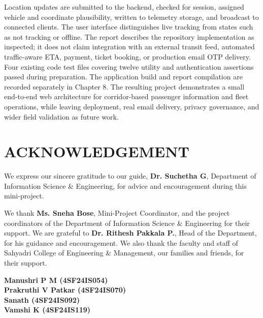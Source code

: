 \documentclass[12pt,a4paper]{report}
\begin{document}
Location updates are submitted to the backend, checked for session, assigned vehicle and coordinate plausibility, written to telemetry storage, and broadcast to connected clients. The user interface distinguishes live tracking from states such as not tracking or offline. The report describes the repository implementation as inspected; it does not claim integration with an external transit feed, automated traffic-aware ETA, payment, ticket booking, or production email OTP delivery. Four existing code test files covering twelve utility and authentication assertions passed during preparation. The application build and report compilation are recorded separately in Chapter 8. The resulting project demonstrates a small end-to-end web architecture for corridor-based passenger information and fleet operations, while leaving deployment, real email delivery, privacy governance, and wider field validation as future work.

\clearpage
\chapter*{ACKNOWLEDGEMENT}
We express our sincere gratitude to our guide, \textbf{Dr. Suchetha G}, Department of Information Science \& Engineering, for advice and encouragement during this mini-project.

We thank \textbf{Ms. Sneha Bose}, Mini-Project Coordinator, and the project coordinators of the Department of Information Science \& Engineering for their support. We are grateful to \textbf{Dr. Rithesh Pakkala P.}, Head of the Department, for his guidance and encouragement. We also thank the faculty and staff of Sahyadri College of Engineering \& Management, our families and friends, for their support.

\vspace{0.2in}\begin{flushright}\textbf{Manushri P M (4SF24IS054)}\\\textbf{Prakruthi V Patkar (4SF24IS070)}\\\textbf{Sanath (4SF24IS092)}\\\textbf{Vamshi K (4SF24IS119)}\end{flushright}

\clearpage\tableofcontents
\clearpage\listoffigures
\clearpage\listoftables
\clearpage{}\setcounter{page}{1}\pagestyle{fancy}

\end{document}
